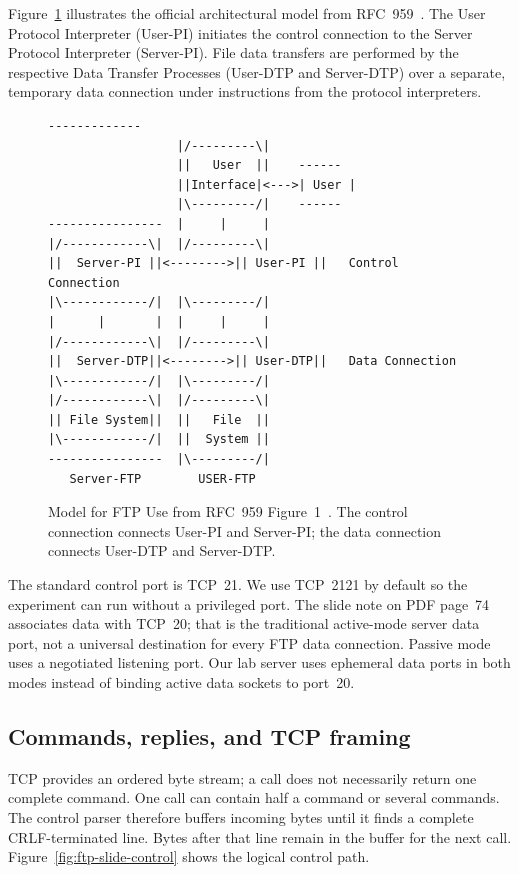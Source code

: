 Figure~\ref{fig:rfc959-model} illustrates the official architectural model from RFC~959~\cite{rfc959}. The User Protocol Interpreter (User-PI) initiates the control connection to the Server Protocol Interpreter (Server-PI). File data transfers are performed by the respective Data Transfer Processes (User-DTP and Server-DTP) over a separate, temporary data connection under instructions from the protocol interpreters.

\begin{figure}[H]
\centering
\begin{lstlisting}[basicstyle=\ttfamily\scriptsize,columns=fixed,numbers=none]
                  -------------
                  |/---------\|
                  ||   User  ||    ------
                  ||Interface|<--->| User |
                  |\---------/|    ------
----------------  |     |     |
|/------------\|  |/---------\|
||  Server-PI ||<-------->|| User-PI ||   Control Connection
|\------------/|  |\---------/|
|      |       |  |     |     |
|/------------\|  |/---------\|
||  Server-DTP||<-------->|| User-DTP||   Data Connection
|\------------/|  |\---------/|
|/------------\|  |/---------\|
|| File System||  ||   File  ||
|\------------/|  ||  System ||
----------------  |\---------/|
   Server-FTP        USER-FTP
\end{lstlisting}
\caption{Model for FTP Use from RFC~959 Figure~1~\cite{rfc959}. The control connection connects User-PI and Server-PI; the data connection connects User-DTP and Server-DTP.}
\label{fig:rfc959-model}
\end{figure}

The standard control port is TCP~21. We use TCP~2121 by default so the experiment can run without a privileged port. The slide note on PDF page~74 associates data with TCP~20; that is the traditional active-mode server data port, not a universal destination for every FTP data connection. Passive mode uses a negotiated listening port. Our lab server uses ephemeral data ports in both modes instead of binding active data sockets to port~20.

\subsection{Commands, replies, and TCP framing}
TCP provides an ordered byte stream; a  call does not necessarily return one complete command. One call can contain half a command or several commands. The control parser therefore buffers incoming bytes until it finds a complete CRLF-terminated line. Bytes after that line remain in the buffer for the next call. Figure~\ref{fig:ftp-slide-control} shows the logical control path.

